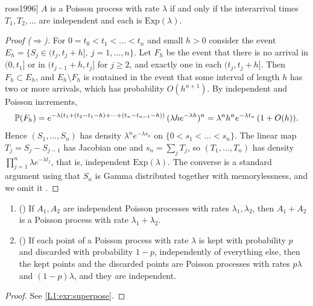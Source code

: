 \begin{theorem}[Exponential interarrival times \cite[\S2.2]{ross1996}]\label{L1:thm:interarrival}
$A$ is a Poisson process with rate $\lambda$ if and only if the interarrival times
$T_1,T_2,\dots$ are independent and each is $\mathrm{Exp}(\lambda)$.
\end{theorem}

\begin{proof}[Proof ($\Rightarrow$)]
For $0=t_0<t_1<\dots<t_n$ and small $h>0$ consider the event
$E_h=\{S_j\in(t_j,t_j+h],\ j=1,\dots,n\}$. Let $F_h$ be the event that there is no
arrival in $(0,t_1]$ or in $(t_{j-1}+h,t_j]$ for $j\ge2$, and exactly one in each
$(t_j,t_j+h]$. Then
$F_h\subset E_h$, and $E_h\setminus F_h$ is contained in the event that some interval
of length $h$ has two or more arrivals, which has probability $O(h^{n+1})$. By
independent and Poisson increments,
\[
  \mathbb{P}(F_h)=e^{-\lambda(t_1+(t_2-t_1-h)+\cdots+(t_n-t_{n-1}-h))}\,(\lambda h e^{-\lambda h})^n
  =\lambda^n h^n e^{-\lambda t_n}\,(1+O(h)).
\]
Hence $(S_1,\dots,S_n)$ has density $\lambda^ne^{-\lambda s_n}$ on
$\{0<s_1<\dots<s_n\}$. The linear map $T_j=S_j-S_{j-1}$ has Jacobian one and
$s_n=\sum_jT_j$, so $(T_1,\dots,T_n)$ has density $\prod_{j=1}^n\lambda e^{-\lambda t_j}$,
that is, independent $\mathrm{Exp}(\lambda)$. The converse is a standard argument
using that $S_n$ is Gamma distributed together with memorylessness, and we omit it
\cite[\S2.2]{ross1996}.
\end{proof}

\begin{proposition}\label{prop:superpose}
\begin{enumerate}[label=(\roman*)]
\item () If $A_1,A_2$ are independent Poisson processes with rates
  $\lambda_1,\lambda_2$, then $A_1+A_2$ is a Poisson process with rate
  $\lambda_1+\lambda_2$.
\item () If each point of a Poisson process with rate $\lambda$ is kept
  with probability $p$ and discarded with probability $1-p$, independently of
  everything else, then the kept points and the discarded points are Poisson
  processes with rates $p\lambda$ and $(1-p)\lambda$, and they are independent.
\end{enumerate}
\end{proposition}

\begin{proof}See \cref{L1:exr:superpose}.\end{proof}

